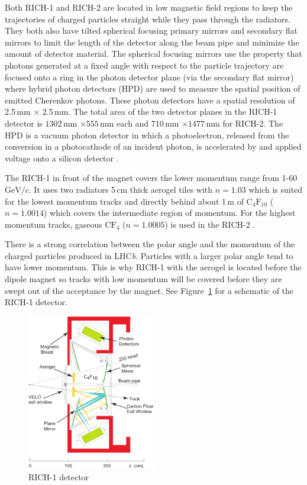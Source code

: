\documentclass[11pt]{scrreprt}
\begin{document}
Both RICH-1 and RICH-2 are located in low magnetic field regions to keep the trajectories of charged particles straight while they pass through the radiators. They both also have tilted spherical focusing primary mirrors and secondary flat mirrors to limit the length of the detector along the beam pipe and minimize the amount of detector material. The spherical focusing mirrors use the property that photons generated at a fixed angle with respect to the particle trajectory are focused onto a ring in the photon detector plane (via the secondary flat mirror) where hybrid photon detectors (HPD) are used to measure the spatial position of emitted Cherenkov photons. These photon detectors have a spatial resolution of 2.5\,mm $\times$ 2.5\,mm. The total area of the two detector planes in the RICH-1 detector is $1302$\,mm $\times 555$\,mm each and $710$\,mm $\times 1477$\,mm for RICH-2.  The HPD is a vacuum photon detector in which a photoelectron, released from the conversion in a photocathode of an incident photon, is accelerated by and applied voltage onto a silicon detector \cite{AlvesJr2008}. 

The RICH-1 in front of the magnet covers the lower momentum range from 1-60 $\text{GeV}/c$. It uses two radiators 5\,cm thick aerogel tiles with $n=1.03$ which is suited for the lowest momentum tracks and directly behind about 1\,m of $\text{C}_4\text{F}_{10}$ ($n=1.0014$) which covers the intermediate region of momentum. For the highest momentum tracks, 
gaseous $\text{C}\text{F}_4$ ($n=1.0005$) is used in the RICH-2 \cite{LHCb2000}.

There is a strong correlation between the polar angle and the momentum of the charged particles produced in LHC\textit{b}. Particles with a larger polar angle tend to have lower momentum. This is why RICH-1 with the aerogel is located before the dipole magnet so tracks with low momentum will be covered before they are swept out of the acceptance by the magnet. See Figure~\ref{fig:rich1} for a schematic of the RICH-1 detector.

\begin{figure}[tb]
  \centering
  \includegraphics[width=0.5\textwidth]{pics/rich1-2d}
  \caption{RICH-1 detector \cite{LHCb:2000}}
  \label{fig:rich1}
\end{figure}
\end{document}
